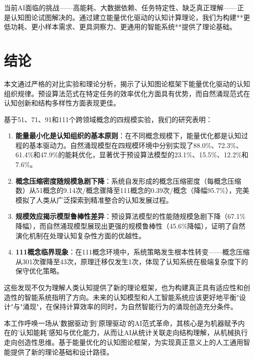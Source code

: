 \documentclass[12pt,a4paper]{article}
\begin{document}
当前AI面临的挑战——高能耗、大数据依赖、任务特定性、缺乏真正理解——正是认知图论试图解决的。通过建立能量优化驱动的认知计算理论，我们为构建**更低功耗、更小样本需求、更具洞察力、更通用的智能系统**提供了理论基础。

\section{结论}

本文通过严格的对比实验和理论分析，揭示了认知图论框架下能量优化驱动的认知组织规律。预设算法范式在特定任务的效率优化方面具有优势，而自然涌现范式在认知创新和结构多样性方面表现更佳。

基于51、71、91和111个跨领域概念的四规模实验，我们的研究表明：

\begin{enumerate}
\item \textbf{能量最小化是认知组织的基本原则}：在不同概念规模下，能量优化都是认知过程的基本驱动力。自然涌现模型在四规模环境中分别实现了88.0\%、72.3\%、61.4\%和47.9\%的能耗优化，显著优于预设算法模型的23.1\%、15.5\%、12.2\%和7.6\%。

\item \textbf{概念压缩密度随规模急剧下降}：系统自发形成的概念压缩密度（每概念压缩数）从51概念的9.14次/概念骤降至111概念的0.39次/概念（降幅95.7\%），完美模拟了人类从广泛探索到精准整合的认知发展过程。

\item \textbf{规模效应揭示模型鲁棒性差异}：预设算法模型的性能随规模急剧下降（67.1\%降幅），而自然涌现模型展现出更强的规模鲁棒性（45.6\%降幅），证明了自然演化机制在处理认知复杂性方面的优越性。

\item \textbf{111概念临界现象}：在111概念环境中，系统策略发生根本性转变——概念压缩从301次骤降至43次，原理迁移仅发生1次，体现了认知系统在极端复杂度下的保守优化策略。
\end{enumerate}

这些发现不仅为理解人类认知提供了新的理论框架，也为构建真正具有适应性和创造性的智能系统指明了方向。未来的认知模型和人工智能系统应该更好地平衡"设计"与"涌现"，在保持计算效率的同时，为自然智能行为的涌现创造充分条件。

本工作呼唤一场从'数据驱动'到'原理驱动'的AI范式革命，其核心是为机器赋予内在的'认知能耗'感知与优化能力，从而让AI从统计关联走向结构理解，从机械执行走向创造性思维。基于能量优化的认知图论框架，为实现真正意义上的人工通用智能提供了新的理论基础和设计路径。
\end{document}
